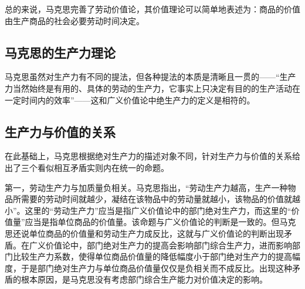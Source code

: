 总的来说，马克思完善了劳动价值论，其价值理论可以简单地表述为：商品的价值由生产商品的社会必要劳动时间决定\cite[51-52]{ZhongGongZhongYangMaKeSiEnGeSiLieNingSiDaLinZhuZuoBianYiJuMaKeSiEnGeSiWenJiDi5Juan2009}。

\subsection{马克思的生产力理论}

马克思虽然对生产力有不同的提法，但各种提法的本质是清晰且一贯的\cite{YangQiaoYuShengChanLiGaiNianCongSiMiDaoMaKeSiDeSiXiangPuXi2013}\cite{DingXiaoPingZhengQueLiJieMaKeSiZhuYiDeShengChanLiGaiNian2021}——“生产力当然始终是有用的、具体的劳动的生产力，它事实上只决定有目的的生产活动在一定时间内的效率”\cite[59]{ZhongGongZhongYangMaKeSiEnGeSiLieNingSiDaLinZhuZuoBianYiJuMaKeSiEnGeSiWenJiDi5Juan2009}——这和广义价值论中绝生产力的定义是相符的。

\subsection{生产力与价值的关系}

在此基础上，马克思根据绝对生产力的描述对象不同，针对生产力与价值的关系给出了三个看似相互矛盾实则内在统一的命题\cite[273]{CaiJiMingCongGuDianZhengZhiJingJiXueDaoZhongGuoTeSeSheHuiZhuYiZhengZhiJingJiXueJiYuZhongGuoShiJiaoDeZhengZhiJingJiXueYanBianShangCe2023}。

第一，劳动生产力与加质量负相关。马克思指出，“劳动生产力越高，生产一种物品所需要的劳动时间就越少，凝结在该物品中的劳动量就越小，该物品的价值就越小”\cite[53]{ZhongGongZhongYangMaKeSiEnGeSiLieNingSiDaLinZhuZuoBianYiJuMaKeSiEnGeSiWenJiDi5Juan2009}。这里的“劳动生产力”应当是指广义价值论中的部门绝对生产力，而这里的“价值量”应当是指单位商品的价值量\cite[273]{CaiJiMingCongGuDianZhengZhiJingJiXueDaoZhongGuoTeSeSheHuiZhuYiZhengZhiJingJiXueJiYuZhongGuoShiJiaoDeZhengZhiJingJiXueYanBianShangCe2023}。该命题与广义价值论的判断是一致的。但马克思还说单位商品的价值量和劳动生产力成反比\cite[53-54]{ZhongGongZhongYangMaKeSiEnGeSiLieNingSiDaLinZhuZuoBianYiJuMaKeSiEnGeSiWenJiDi5Juan2009}，这就与广义价值论的判断出现矛盾。在广义价值论中，部门绝对生产力的提高会影响部门综合生产力，进而影响部门比较生产力系数，使得单位商品价值量的降低幅度小于部门绝对生产力的提高幅度，于是部门绝对生产力与单位商品价值量仅仅是负相关而不成反比\cite[274, 282]{CaiJiMingCongGuDianZhengZhiJingJiXueDaoZhongGuoTeSeSheHuiZhuYiZhengZhiJingJiXueJiYuZhongGuoShiJiaoDeZhengZhiJingJiXueYanBianShangCe2023}。出现这种矛盾的根本原因，是马克思没有考虑部门综合生产能力对价值决定的影响。

